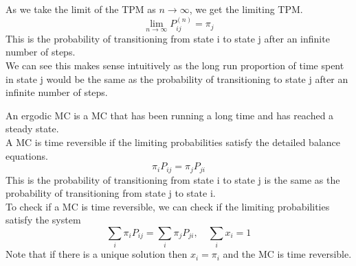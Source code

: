 \documentclass[answers,12pt,addpoints]{exam}
\begin{document}
\begin{definition}
    As we take the limit of the TPM as $n \to \infty$, we get the limiting TPM.\\
    $$\lim_{n \to \infty} P_{ij}^{(n)} = \pi_j$$
    This is the probability of transitioning from state i to state j after an infinite number of steps.\\
    We can see this makes sense intuitively as the long run proportion of time spent in state j would be the same as the probability of transitioning to state j after an infinite number of steps.
\end{definition}
\begin{definition}
    An ergodic MC is a MC that has been running a long time and has reached a steady state.\\
    A MC is time reversible if the limiting probabilities satisfy the detailed balance equations.\\
    $$\pi_i P_{ij} = \pi_j P_{ji}$$
    This is the probability of transitioning from state i to state j is the same as the probability of transitioning from state j to state i.\\
    To check if a MC is time reversible, we can check if the limiting probabilities satisfy the system
    $$ \sum_{i} \pi_i P_{ij} = \sum_{i} \pi_j P_{ji}, \quad \sum_i x_i = 1$$
    Note that if there is a unique solution then $x_i = \pi_i$ and the MC is time reversible.
\end{definition}
\end{document}
